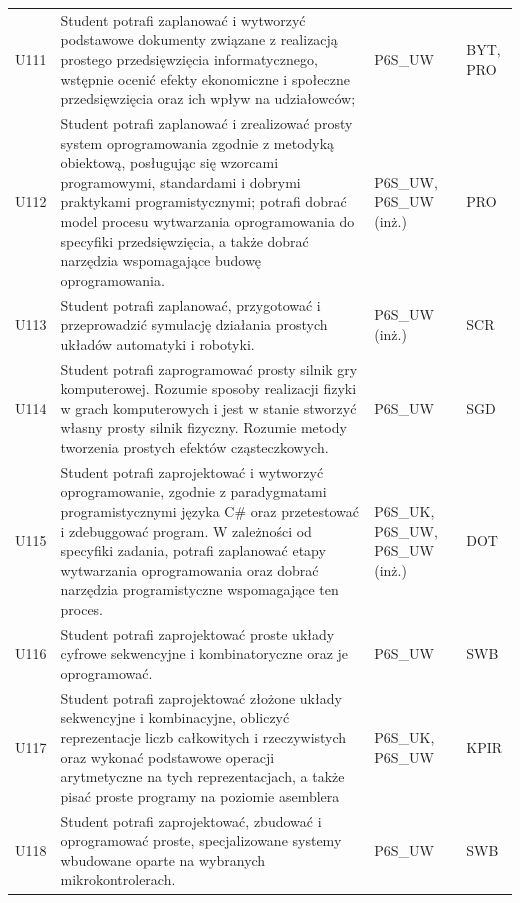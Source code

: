 \documentclass[12pt,a4paper]{article}
\begin{document}
{\begin{longtable}{m{1cm}m{8.8cm}m{2.1cm}m{2.5cm}}
\rowcolor{tableRowLight} U111 & Student potrafi zaplanować i wytworzyć podstawowe dokumenty związane z realizacją prostego przedsięwzięcia informatycznego, wstępnie ocenić efekty ekonomiczne i społeczne przedsięwzięcia oraz ich wpływ na udziałowców; & {\scriptsize P6S\_UW} & {\scriptsize BYT, PRO} \\
\rowcolor{tableRowAlt} U112 & Student potrafi zaplanować i zrealizować prosty system oprogramowania zgodnie z metodyką obiektową, posługując się wzorcami programowymi, standardami i dobrymi praktykami programistycznymi; potrafi dobrać model procesu wytwarzania oprogramowania do specyfiki przedsięwzięcia, a także dobrać narzędzia wspomagające budowę oprogramowania. & {\scriptsize P6S\_UW, P6S\_UW {\scriptsize (inż.)}} & {\scriptsize PRO} \\
\rowcolor{tableRowLight} U113 & Student potrafi zaplanować, przygotować i przeprowadzić symulację działania prostych układów automatyki i robotyki. & {\scriptsize P6S\_UW {\scriptsize (inż.)}} & {\scriptsize SCR} \\
\rowcolor{tableRowAlt} U114 & Student potrafi zaprogramować prosty silnik gry komputerowej. Rozumie sposoby realizacji fizyki w grach komputerowych i jest w stanie stworzyć własny prosty silnik fizyczny. Rozumie metody tworzenia prostych efektów cząsteczkowych. & {\scriptsize P6S\_UW} & {\scriptsize SGD} \\
\rowcolor{tableRowLight} U115 & Student potrafi zaprojektować i wytworzyć oprogramowanie, zgodnie z paradygmatami programistycznymi języka C\# oraz przetestować i zdebuggować program. W zależności od specyfiki zadania, potrafi zaplanować etapy wytwarzania oprogramowania oraz dobrać narzędzia programistyczne wspomagające ten proces. & {\scriptsize P6S\_UK, P6S\_UW, P6S\_UW {\scriptsize (inż.)}} & {\scriptsize DOT} \\
\rowcolor{tableRowAlt} U116 & Student potrafi zaprojektować proste układy cyfrowe sekwencyjne i kombinatoryczne oraz je oprogramować. & {\scriptsize P6S\_UW} & {\scriptsize SWB} \\
\rowcolor{tableRowLight} U117 & Student potrafi zaprojektować złożone układy sekwencyjne i kombinacyjne, obliczyć reprezentacje liczb całkowitych i rzeczywistych oraz wykonać podstawowe operacji arytmetyczne na tych reprezentacjach, a także pisać proste programy na poziomie asemblera & {\scriptsize P6S\_UK, P6S\_UW} & {\scriptsize KPIR} \\
\rowcolor{tableRowAlt} U118 & Student potrafi zaprojektować, zbudować i oprogramować proste, specjalizowane systemy wbudowane oparte na wybranych mikrokontrolerach. & {\scriptsize P6S\_UW} & {\scriptsize SWB} \\

\end{longtable}}
\end{document}
